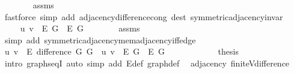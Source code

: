 \begin{isabellebody}
\ \ \ \ \ \ \isamarkupfalse%
\ assms\isanewline
\ \ \ \ \ \ \isamarkupfalse%
\ {\isacharparenleft}{\kern0pt}fastforce\ simp\ add{\isacharcolon}{\kern0pt}\ adjacency{\isacharunderscore}{\kern0pt}difference{\isacharunderscore}{\kern0pt}cong\ dest{\isacharcolon}{\kern0pt}\ symmetric{\isacharunderscore}{\kern0pt}adjacency{\isachardot}{\kern0pt}invar{\isacharparenright}{\kern0pt}\isanewline
\ \ \ \ \isamarkupfalse%
\ \isamarkupfalse%
\ {\isachardoublequoteopen}{\isachardot}{\kern0pt}{\isachardot}{\kern0pt}{\isachardot}{\kern0pt}\ {\isasymlongleftrightarrow}\ {\isacharbraceleft}{\kern0pt}u{\isacharcomma}{\kern0pt}\ v{\isacharbraceright}{\kern0pt}\ {\isasymin}\ E\ G{}\ {\isacharminus}{\kern0pt}\ E\ G{}{\isachardoublequoteclose}\isanewline
\ \ \ \ \ \ \isamarkupfalse%
\ assms\isanewline
\ \ \ \ \ \ \isamarkupfalse%
\ {\isacharparenleft}{\kern0pt}simp\ add{\isacharcolon}{\kern0pt}\ symmetric{\isacharunderscore}{\kern0pt}adjacency{\isachardot}{\kern0pt}mem{\isacharunderscore}{\kern0pt}adjacency{\isacharunderscore}{\kern0pt}iff{\isacharunderscore}{\kern0pt}edge{\isacharparenright}{\kern0pt}\isanewline
\ \ \ \ \isamarkupfalse%
\ \isamarkupfalse%
\ {\isachardoublequoteopen}{\isacharbraceleft}{\kern0pt}u{\isacharcomma}{\kern0pt}\ v{\isacharbraceright}{\kern0pt}\ {\isasymin}\ E\ {\isacharparenleft}{\kern0pt}difference\ G{}\ G{}{\isacharparenright}{\kern0pt}\ {\isasymlongleftrightarrow}\ {\isacharbraceleft}{\kern0pt}u{\isacharcomma}{\kern0pt}\ v{\isacharbraceright}{\kern0pt}\ {\isasymin}\ E\ G{}\ {\isacharminus}{\kern0pt}\ E\ G{}{\isachardoublequoteclose}\isanewline
\ \ \ \ \ \ \isacommand{{\isachardot}{\kern0pt}}\isamarkupfalse%
\ \isacommand{{\isacharbraceright}{\kern0pt}}\isamarkupfalse%
\isanewline
\ \ \isamarkupfalse%
\ {\isacharquery}{\kern0pt}thesis\isanewline
\ \ \ \ \isamarkupfalse%
\ {\isacharparenleft}{\kern0pt}intro\ graphs{\isacharunderscore}{\kern0pt}eqI{\isacharparenright}{\kern0pt}\ {\isacharparenleft}{\kern0pt}auto\ simp\ add{\isacharcolon}{\kern0pt}\ E{\isacharunderscore}{\kern0pt}def\ graph{\isacharunderscore}{\kern0pt}def{\isacharparenright}{\kern0pt}\isanewline
{}\isamarkupfalse%
%
\endisatagproof
{\isafoldproof}%
%
\isadelimproof
\isanewline
%
\endisadelimproof
\isanewline
{}\isamarkupfalse%
\ {\isacharparenleft}{\kern0pt}\ adjacency{\isacharparenright}{\kern0pt}\ finite{\isacharunderscore}{\kern0pt}V{\isacharunderscore}{\kern0pt}difference{\isacharcolon}{\kern0pt}\isanewline

\end{isabellebody}
